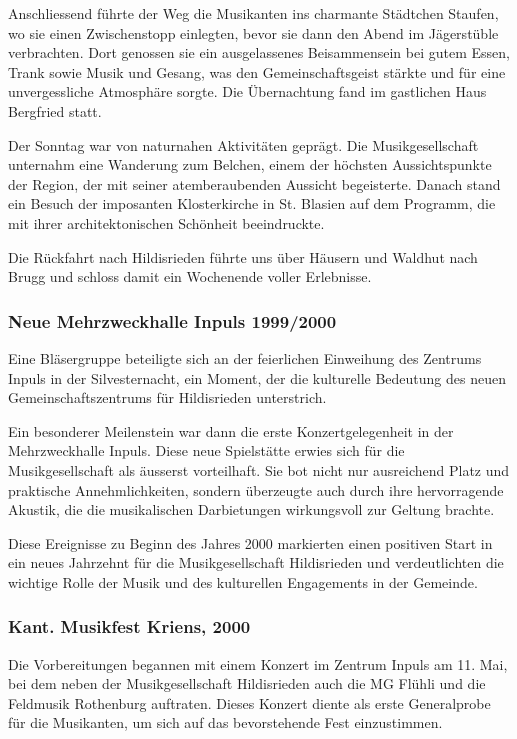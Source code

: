 \begin{history}
    Anschliessend führte der Weg die Musikanten ins charmante Städtchen Staufen,
    wo sie einen Zwischenstopp einlegten, bevor sie dann den Abend im
    Jägerstüble verbrachten. Dort genossen sie ein ausgelassenes Beisammensein
    bei gutem Essen, Trank sowie Musik und Gesang, was den Gemeinschaftsgeist
    stärkte und für eine unvergessliche Atmosphäre sorgte. Die Übernachtung fand
    im gastlichen Haus Bergfried statt.

    Der Sonntag war von naturnahen Aktivitäten geprägt. Die Musikgesellschaft
    unternahm eine Wanderung zum Belchen, einem der höchsten Aussichtspunkte der
    Region, der mit seiner atemberaubenden Aussicht begeisterte. Danach stand
    ein Besuch der imposanten Klosterkirche in St. Blasien auf dem Programm, die
    mit ihrer architektonischen Schönheit beeindruckte.

    Die Rückfahrt nach Hildisrieden führte uns über Häusern und Waldhut nach
    Brugg und schloss damit ein Wochenende voller Erlebnisse.

    \subsubsection*{Neue Mehrzweckhalle Inpuls 1999/2000}

    Eine Bläsergruppe beteiligte sich an der feierlichen Einweihung des Zentrums
    Inpuls in der Silvesternacht, ein Moment, der die kulturelle Bedeutung des
    neuen Gemeinschaftszentrums für Hildisrieden unterstrich.

    Ein besonderer Meilenstein war dann die erste Konzertgelegenheit in der
    Mehrzweckhalle Inpuls. Diese neue Spielstätte erwies sich für die
    Musikgesellschaft als äusserst vorteilhaft. Sie bot nicht nur ausreichend
    Platz und praktische Annehmlichkeiten, sondern überzeugte auch durch ihre
    hervorragende Akustik, die die musikalischen Darbietungen wirkungsvoll zur
    Geltung brachte.

    Diese Ereignisse zu Beginn des Jahres 2000 markierten einen positiven Start
    in ein neues Jahrzehnt für die Musikgesellschaft Hildisrieden und
    verdeutlichten die wichtige Rolle der Musik und des kulturellen Engagements
    in der Gemeinde.

    \subsubsection*{Kant. Musikfest Kriens, 2000}

    Die Vorbereitungen begannen mit einem Konzert im Zentrum Inpuls am 11. Mai,
    bei dem neben der Musikgesellschaft Hildisrieden auch die MG Flühli und die
    Feldmusik Rothenburg auftraten. Dieses Konzert diente als erste Generalprobe
    für die Musikanten, um sich auf das bevorstehende Fest einzustimmen.


\end{history}
